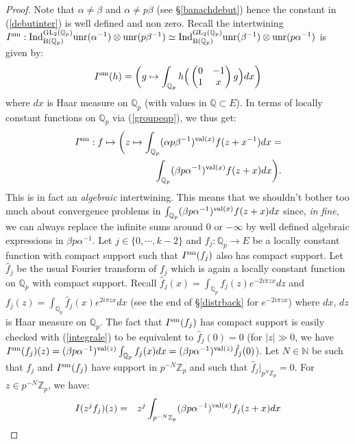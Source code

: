 \documentclass[11pt]{amsart}
\def\Z{{\mathbb Z}_p}
\def\Q{{\mathbb Q}_p}
\def\G{{\rm GL}_2(\Q)}
\def\B{{\rm B}(\Q)}
\begin{document}
\begin{proof} 
Note that $\alpha\ne \beta$ and $\alpha\ne p\beta$ (see
\S\ref{banachdebut}) hence the constant in (\ref{debutinter}) is well
defined and non zero. Recall the intertwining $I^{\rm sm}:{\rm
  Ind}_{\B}^{\G}{\rm unr}(\alpha^{-1})\otimes {\rm
  unr}(p\beta^{-1})\simeq {\rm Ind}_{\B}^{\G}{\rm
  unr}(\beta^{-1})\otimes {\rm unr}(p\alpha^{-1})$ is given by:  
\begin{eqnarray}\label{integrale2} 
I^{\rm sm}(h)= \bigg(g\mapsto
\int_{\Q}h\Big(\begin{pmatrix}0&-1\\1&x\end{pmatrix}g\Big)dx\bigg)  
\end{eqnarray} 
where $dx$ is Haar measure on $\Q$ (with values in ${\mathbb Q}\subset
E$). In terms of locally constant functions on $\Q$ via
(\ref{groupeqp}), we thus get:  
\begin{eqnarray}\label{integrale} 
I^{\rm sm}:f\mapsto \bigg(z\mapsto \int_{\Q}
(\alpha p\beta^{-1})^{{\rm val}(x)}f(z+x^{-1})dx=\\ 
\nonumber \int_{\Q}(\beta p\alpha^{-1})^{{\rm val}(x)}f(z+x)dx\bigg). 
\end{eqnarray} 
This is in fact an {\it algebraic} intertwining. This means that we
shouldn't bother too much about convergence problems in
$\int_{\Q}(\beta p\alpha^{-1})^{{\rm val}(x)}f(z+x)dx$ since, {\it in
  fine}, we can always replace the infinite sums around $0$ or
$-\infty$ by well defined algebraic expressions in $\beta
p\alpha^{-1}$. Let $j\in \{0,\cdots,k-2\}$ and $f_j:\Q\rightarrow E$
be a locally constant function with compact support such that $I^{\rm
  sm}(f_j)$ also has compact support. Let $\hat f_j$ be the usual
Fourier transform of $f_j$ which is again a locally constant function
on $\Q$ with compact support. Recall $\hat
f_j(x)=\int_{\Q}f_j(z)e^{-2i\pi zx}dz$ and $f_j(z)=\int_{\Q}\hat
f_j(x)e^{2i\pi zx}dx$ (see the end of \S\ref{distrback} for $e^{-2i\pi
  zx}$) where $dx$, $dz$ is Haar measure on $\Q$. The fact that
$I^{\rm sm}(f_j)$ has compact support is easily checked with
(\ref{integrale}) to be equivalent to $\hat f_j(0)=0$ (for $|z|\gg 0$,
we have $I^{\rm sm}(f_j)(z)=(\beta p\alpha^{-1})^{{\rm
    val}(z)}\int_{\Q}f_j(x)dx=(\beta p\alpha^{-1})^{{\rm val}(z)}\hat
f_j(0)$). Let $N\in {\mathbb N}$ be such that $f_j$ and $I^{\rm
  sm}(f_j)$ have support in $p^{-N}\Z$ and such that $\hat
f_j|_{p^N\Z}=0$. For $z\in p^{-N}\Z$, we have:  
\begin{eqnarray*} 
I(z^jf_j)(z)&=&z^j\int_{p^{-N}\Z}(\beta p\alpha^{-1})^{{\rm val}(x)}f_j(z+x)dx\\ 

\end{eqnarray*}
\end{proof}
\end{document}
